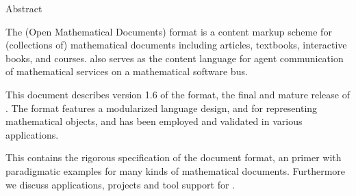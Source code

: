 
\begin{omgroup}[display=flow]{Abstract}
\begin{omtext}[type=introduction]
The {\omdoc} (Open Mathematical Documents) format is a content markup scheme for
(collections of) mathematical documents including articles, textbooks, interactive
books, and courses.  {\omdoc} also serves as the content language for agent
communication of mathematical services on a mathematical software bus.
\end{omtext}

\begin{omtext}
This document describes version 1.6 of the {\omdoc} format, the final and mature
release of {}. The format features a modularized language design,
{\openmath} and {\mathml} for representing mathematical objects, and has been
employed and validated in various applications.
\end{omtext}

\begin{omtext}
This {\report} contains the rigorous specification of the {\omdoc} document format, an
{\omdoc} primer with paradigmatic examples for many kinds of mathematical documents.
Furthermore we discuss applications, projects and tool support for {\omdoc}.
\end{omtext}
\end{omgroup}


